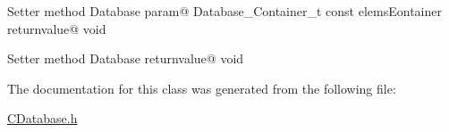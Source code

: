Setter method Database param@ Database\+\_\+\+Container\+\_\+t const elems\+Eontainer returnvalue@ void

Setter method Database returnvalue@ void 

The documentation for this class was generated from the following file\+:\begin{DoxyCompactItemize}
\item 
\hyperlink{CDatabase_8h}{C\+Database.\+h}\end{DoxyCompactItemize}
